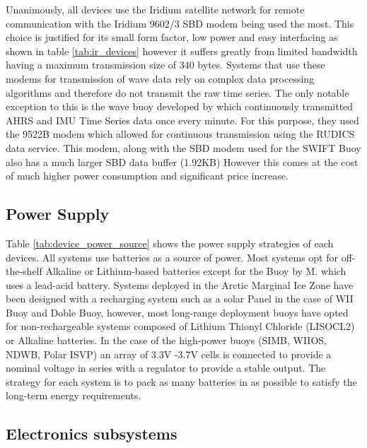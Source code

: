 Unanimously, all devices use the Iridium satellite network for remote communication with the Iridium 9602/3 SBD modem being used the most.  This choice is justified for its small form factor, low power and easy interfacing as shown in table \ref{tab:ir_devices} however it suffers greatly from limited bandwidth having a maximum transmission size of 340 bytes. Systems that use these modems for transmission of wave data rely on complex data processing algorithms and therefore do not transmit the raw time series. The only notable exception to this is the wave buoy developed by\textcite{doble2017robust} which continuously transmitted AHRS and IMU Time Series data once every minute. For this purpose, they used the 9522B modem which allowed for continuous transmission using the RUDICS data service. This modem, along with the SBD modem used for the SWIFT Buoy also has a much larger SBD data buffer (1.92KB) However this comes at the cost of much higher power consumption and significant price increase.  

\subsection{Power Supply}

Table \ref{tab:device_power_source}  shows the power supply strategies of each devices. All systems use batteries as a source of power. Most systems opt for off-the-shelf Alkaline or Lithium-based batteries except for the Buoy by M. \textcite{doble2017robust} which uses a lead-acid battery. Systems deployed in the Arctic Marginal Ice Zone have been designed with a recharging system such as a solar Panel in the case of WII Buoy and Doble Buoy, however, most long-range deployment buoys have opted for non-rechargeable systems composed of Lithium Thionyl Chloride (LISOCL2) or Alkaline batteries. In the case of the high-power buoys (SIMB, WIIOS, NDWB, Polar ISVP) an array of 3.3V -3.7V cells is connected to provide a nominal voltage in series with a regulator to provide a stable output. The strategy for each system is to pack as many batteries in as possible to satisfy the long-term energy requirements.

\subsection{Electronics subsystems}

